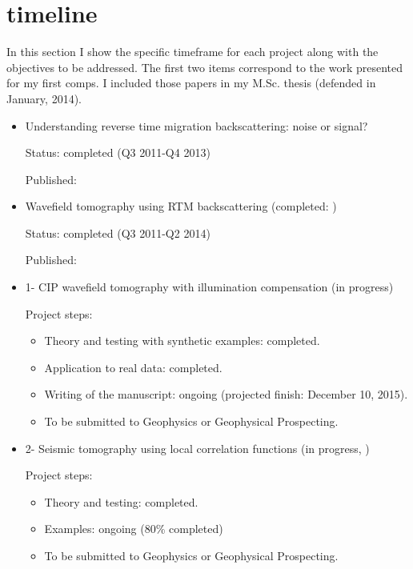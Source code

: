 \section{timeline}
In this section I show the specific timeframe for each
project along with the objectives to be addressed. The first two items
correspond to the work presented for my first comps. I included those
papers in my M.Sc. thesis (defended in January, 2014).


\begin{itemize}
  \item Understanding reverse time migration backscattering: noise or signal?
  
        Status: completed (Q3 2011-Q4 2013)
          
        Published: \cite{DiazRTM}

  \item Wavefield tomography using RTM backscattering (completed: \cite{diaz2015})

        Status: completed (Q3 2011-Q2 2014)
          
        Published:  \cite{diaz2015}


  \item {1- CIP wavefield tomography with illumination compensation (in progress)}
        
        Project steps: 
          \begin{itemize}
            \item Theory and testing with synthetic examples: completed.
            \item Application to real data: completed.
            \item Writing of the manuscript: ongoing (projected finish: December 10, 2015).
            \item To be submitted to Geophysics or Geophysical Prospecting.
          \end{itemize}

  \item {2- Seismic tomography using local correlation functions (in progress, \cite{DiazLcorr})}

        Project steps: 
          \begin{itemize}
            \item Theory and testing: completed.  
            \item Examples: ongoing (80\% completed) 
            \item To be submitted to Geophysics or Geophysical Prospecting.
          \end{itemize}


\end{itemize}
